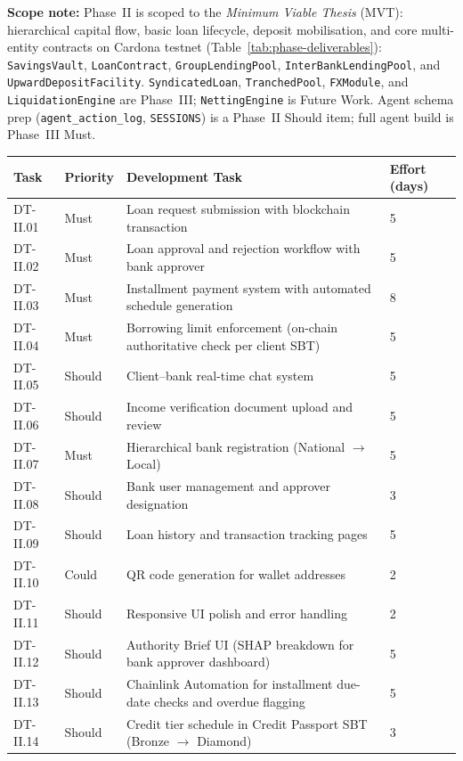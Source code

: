 \documentclass[12pt,a4paper]{report}
\newcommand{\tableheadcolor}{\rowcolor{TableHeadBg}}
\begin{document}
\textbf{Scope note:} Phase~II is scoped to the \textit{Minimum Viable Thesis} (MVT): hierarchical capital flow, basic loan lifecycle, deposit mobilisation, and core multi-entity contracts on Cardona testnet (Table~\ref{tab:phase-deliverables}): \texttt{SavingsVault}, \texttt{LoanContract}, \texttt{GroupLendingPool}, \texttt{InterBankLendingPool}, and \texttt{UpwardDepositFacility}. \texttt{SyndicatedLoan}, \texttt{TranchedPool}, \texttt{FXModule}, and \texttt{LiquidationEngine} are Phase~III; \texttt{NettingEngine} is Future Work. Agent schema prep (\texttt{agent\_action\_log}, \texttt{SESSIONS}) is a Phase~II Should item; full agent build is Phase~III Must.

\begin{table}[H]
\centering
\begin{tabular}{p{1.8cm}p{1.8cm}p{7.5cm}p{1.5cm}}
\toprule
\tableheadcolor
\textbf{Task} & \textbf{Priority} & \textbf{Development Task} & \textbf{Effort (days)} \\
\midrule
DT-II.01 & Must & Loan request submission with blockchain transaction & 5 \\
DT-II.02 & Must & Loan approval and rejection workflow with bank approver & 5 \\
DT-II.03 & Must & Installment payment system with automated schedule generation & 8 \\
DT-II.04 & Must & Borrowing limit enforcement (on-chain authoritative check per client SBT) & 5 \\
DT-II.05 & Should & Client--bank real-time chat system & 5 \\
DT-II.06 & Should & Income verification document upload and review & 5 \\
DT-II.07 & Must & Hierarchical bank registration (National $\to$ Local) & 5 \\
DT-II.08 & Should & Bank user management and approver designation & 3 \\
DT-II.09 & Should & Loan history and transaction tracking pages & 5 \\
DT-II.10 & Could & QR code generation for wallet addresses & 2 \\
DT-II.11 & Should & Responsive UI polish and error handling & 2 \\
DT-II.12 & Should & Authority Brief UI (SHAP breakdown for bank approver dashboard) & 5 \\
DT-II.13 & Should & Chainlink Automation for installment due-date checks and overdue flagging & 5 \\
DT-II.14 & Should & Credit tier schedule in Credit Passport SBT (Bronze $\to$ Diamond) & 3 \\

\end{tabular}
\end{table}
\end{document}
